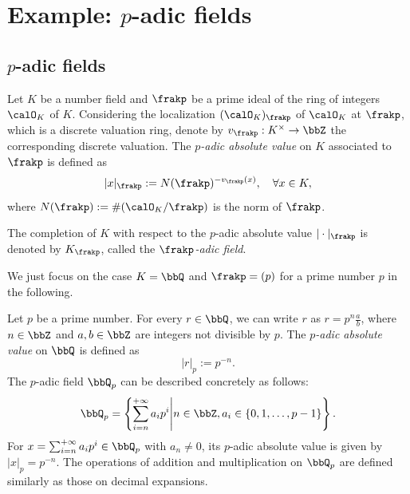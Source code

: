 \section[Example: p-adic fields]{Example: \(p\)-adic fields}

\subsection[p-adic fields]{\(p\)-adic fields}

    \begin{construction}\label{constr:p-adic_absolute_value_on_number_field}
        Let \(K\) be a number field and \(\frakp\) be a prime ideal of the ring of integers \(\calO_K\) of \(K\).
        Considering the localization \((\calO_K)_\frakp\) of \(\calO_K\) at \(\frakp\), which is a discrete valuation ring, denote by \(v_\frakp: K^\times \to \bbZ\) the corresponding discrete valuation.
        The \emph{\(p\)-adic absolute value} on \(K\) associated to \(\frakp\) is defined as
        \[ |x|_\frakp := N(\frakp)^{-v_\frakp(x)},\quad\forall x \in K, \]
        where \(N(\frakp) := \#(\calO_K / \frakp)\) is the norm of \(\frakp\).

        The completion of \(K\) with respect to the \(p\)-adic absolute value \(|\cdot|_\frakp\) is denoted by \(K_\frakp\), called the \emph{\(\frakp\)-adic field}.
    \end{construction}

    We just focus on the case \(K = \bbQ\) and \(\frakp = (p)\) for a prime number \(p\) in the following.

    \begin{example}\label{eg:p-adic_field}
        Let \(p\) be a prime number. 
        For every \(r \in \bbQ\), we can write \(r\) as \(r = p^n \frac{a}{b}\), where \(n \in \bbZ\) and \(a,b \in \bbZ\) are integers not divisible by \(p\).
        The \emph{\(p\)-adic absolute value} on \(\bbQ\) is defined as
        \[ |r|_p := p^{-n}. \]
        The \(p\)-adic field \(\bbQ_p\) can be described concretely as follows:
        \[ \bbQ_p = \left\{ \sum_{i = n}^{+\infty} a_i p^i \middle| n \in \bbZ, a_i \in \{0, 1, \ldots, p-1\} \right\}. \]
        For \(x = \sum_{i = n}^{+\infty} a_i p^i \in \bbQ_p\) with \(a_n \neq 0\), its \(p\)-adic absolute value is given by \(|x|_p = p^{-n}\).
        The operations of addition and multiplication on \(\bbQ_p\) are defined similarly as those on decimal expansions.
    \end{example}

